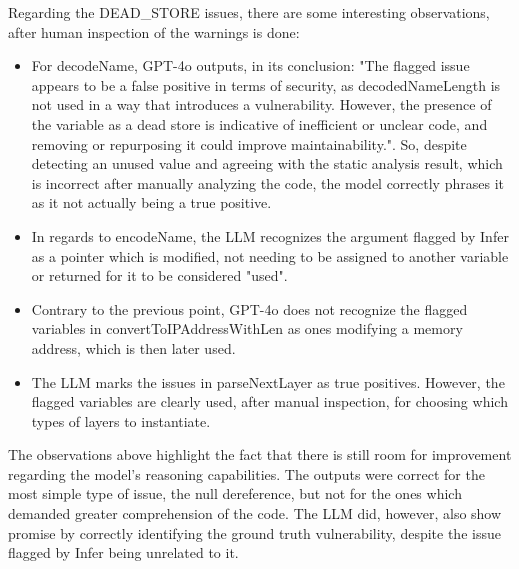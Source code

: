 Regarding the DEAD\_STORE issues, there are some interesting observations, after human inspection of the warnings is done:
\begin{itemize}
    \item For decodeName, GPT-4o outputs, in its conclusion: "The flagged issue appears to be a false positive in terms of security, as decodedNameLength is not used in a way that introduces a vulnerability. However, the presence of the variable as a dead store is indicative of inefficient or unclear code, and removing or repurposing it could improve maintainability.". So, despite detecting an unused value and agreeing with the static analysis result, which is incorrect after manually analyzing the code, the model correctly phrases it as it not actually being a true positive. 
    \item In regards to encodeName, the LLM recognizes the argument flagged by Infer as a pointer which is modified, not needing to be assigned to another variable or returned for it to be considered "used".
    \item Contrary to the previous point, GPT-4o does not recognize the flagged variables in convertToIPAddressWithLen as ones modifying a memory address, which is then later used.
    \item The LLM marks the issues in parseNextLayer as true positives. However, the flagged variables are clearly used, after manual inspection, for choosing which types of layers to instantiate.
\end{itemize}

The observations above highlight the fact that there is still room for improvement regarding the model's reasoning capabilities. The outputs were correct for the most simple type of issue, the null dereference, but not for the ones which demanded greater comprehension of the code.
The LLM did, however, also show promise by correctly identifying the ground truth vulnerability, despite the issue flagged by Infer being unrelated to it.